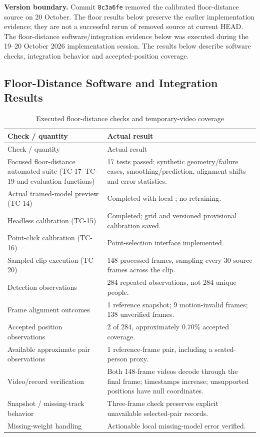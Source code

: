 \textbf{Version boundary.} Commit \texttt{8c3a6fe} removed the calibrated floor-distance source on 20 October. The floor results below preserve the earlier implementation evidence; they are not a successful rerun of removed source at current HEAD. The floor-distance software/integration evidence below was executed during the 19--20 October 2026 implementation session. The results below describe software checks, integration behavior and accepted-position coverage.

\subsection{Floor-Distance Software and Integration Results}
\begin{longtable}{P{0.42\textwidth}P{0.44\textwidth}}
\caption{Executed floor-distance checks and temporary-video coverage}\label{tab:floor-results}\\
\toprule
Check / quantity & Actual result\\
\midrule
\endfirsthead
\toprule
Check / quantity & Actual result\\
\midrule
\endhead
Focused floor-distance automated suite (TC-17--TC-19 and evaluation functions) & 17 tests passed; synthetic geometry/failure cases, smoothing/prediction, alignment shifts and error statistics.\\
Actual trained-model preview (TC-14) & Completed with local ; no retraining.\\
Headless calibration (TC-15) & Completed; grid and versioned provisional calibration saved.\\
Point-click calibration (TC-16) & Point-selection interface implemented.\\
Sampled clip execution (TC-20) & 148 processed frames, sampling every 30 source frames across the clip.\\
Detection observations & 284 repeated observations, not 284 unique people.\\
Frame alignment outcomes & 1 reference snapshot; 9 motion-invalid frames; 138 unverified frames.\\
Accepted position observations & 2 of 284, approximately 0.70\% accepted coverage.\\
Available approximate pair observations & 1 reference-frame pair, including a seated-person proxy.\\
Video/record verification & Both 148-frame videos decode through the final frame; timestamps increase; unsupported positions have null coordinates.\\
Snapshot / missing-track behavior & Three-frame check preserves explicit unavailable selected-pair records.\\
Missing-weight handling & Actionable local missing-model error verified.\\
\bottomrule
\end{longtable}
